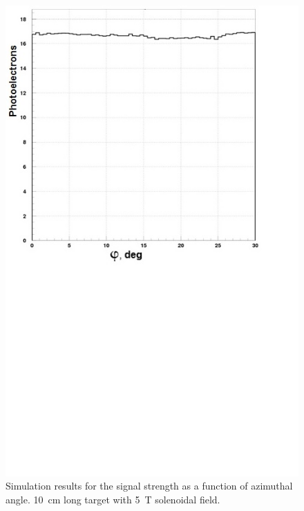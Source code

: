 \begin{figure}[!ht]
    \centering
    \includegraphics[width=1.0\linewidth,trim={0.0cm 9.4cm 0.0cm 0.0cm},clip]{images/10cm_Targ_5T_Field_Phi.jpg}
    \caption{Simulation results for the signal strength as a function of azimuthal angle. 10~cm long target with 5~T
      solenoidal field.}
    \label{fig:10cm_Targ_5T_Field_Phi}
\end{figure}

